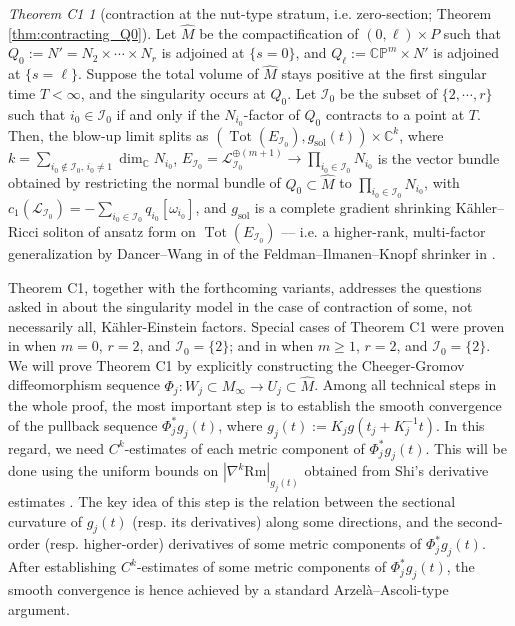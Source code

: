 \documentclass[11pt]{amsart}
\theoremstyle{plain}
\numberwithin{equation}{section}
\theoremstyle{definition}
\theoremstyle{remark}
\newtheorem*{thmC1}{Theorem C1}
\begin{document}
\begin{thmC1}[contraction at the nut-type stratum, i.e. zero-section; Theorem \ref{thm:contracting_Q0}]
Let $\widehat{M}$ be the compactification of $(0,\ell) \times P$ such that $Q_0 := N' = N_2 \times \cdots \times N_r$ is adjoined at $\{s = 0\}$, and $Q_\ell := \mathbb{CP}^m \times N'$ is adjoined at $\{s = \ell\}$. Suppose the total volume of $\widehat{M}$ stays positive at the first singular time $T < \infty$, and the singularity occurs at $Q_0$. Let $\mathcal{I}_0$ be the subset of $\{2, \cdots, r\}$ such that $i_0 \in \mathcal{I}_0$ if and only if the $N_{i_0}$-factor of $Q_0$ contracts to a point at $T$. Then, the blow-up limit splits as $( \operatorname{Tot} ( E_{\mathcal{I}_0} ), g_{\mathrm{sol}} ( t ) ) \times \mathbb{C}^k$, where $k = \sum_{i_0 \not\in \mathcal{I}_0,\, i_0 \not= 1} \dim_{\mathbb{C}} N_{i_0}$, $E_{\mathcal{I}_0} = \mathcal{L}_{\mathcal{I}_0}^{\oplus ( m + 1 )} \to \prod_{i_0 \in \mathcal{I}_0} N_{i_0}$ is the vector bundle obtained by restricting the normal bundle of $Q_0 \subset \widehat{M}$ to $\prod_{i_0 \in \mathcal{I}_0} N_{i_0}$, with $c_1 ( \mathcal{L}_{\mathcal{I}_0} ) = - \sum_{i_0 \in \mathcal{I}_0} q_{i_0} [\omega_{i_0}]$, and $g_{\mathrm{sol}}$ is a complete gradient shrinking K\"ahler--Ricci soliton of ansatz form on $\operatorname{Tot} ( E_{\mathcal{I}_0} )$ --- i.e. a higher-rank, multi-factor generalization by Dancer--Wang in \cite{DW2011} of the Feldman--Ilmanen--Knopf shrinker in \cite{FIK}.
\end{thmC1}

Theorem C1, together with the forthcoming variants, addresses the questions asked in \cite{FT} about the singularity model in the case of contraction of some, not necessarily all, K\"ahler-Einstein factors. Special cases of Theorem C1 were proven in \cite{S, GS} when $m = 0$, $r = 2$, and $\mathcal{I}_0 = \{2\}$; and in \cite{JST} when $m \geq 1$, $r = 2$, and $\mathcal{I}_0 = \{2\}$. We will prove Theorem C1 by explicitly constructing the Cheeger-Gromov diffeomorphism sequence $\Phi_j : W_j \subset M_\infty \to U_j \subset \widehat{M}$. Among all technical steps in the whole proof, the most important step is to establish the smooth convergence of the pullback sequence $\Phi_j^* g_j(t)$, where $g_j(t) := K_jg(t_j + K_j^{-1}t)$. In this regard, we need $C^k$-estimates of each metric component of $\Phi_j^*g_j(t)$. This will be done using the uniform bounds on $|\nabla^k \textrm{Rm}|_{g_j(t)}$ obtained from Shi's derivative estimates \cite{Shi}. The key idea of this step is the relation between the sectional curvature of $g_j(t)$ (resp. its derivatives) along some directions, and the second-order (resp. higher-order) derivatives of some metric components of $\Phi_j^*g_j(t)$. After establishing $C^k$-estimates of some metric components of $\Phi_j^*g_j(t)$, the smooth convergence is hence achieved by a standard Arzel\`a--Ascoli-type argument.
\end{document}
